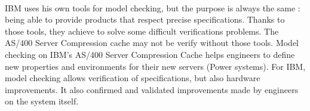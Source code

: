 \documentclass[a4paper,12pt]{article} %
\begin{document}
\paragraph{}IBM uses his own tools for model checking, but the purpose is always the same : being able to provide products that respect precise specifications. Thanks to those tools, they achieve to solve some difficult verifications problems. The AS/400 Server Compression cache may not be verify without those tools. Model checking on IBM's AS/400 Server Compression Cache helps engineers to define new properties and environments for their new servers (Power systems). For IBM, model checking allows verification of specifications, but also hardware improvements. It also confirmed and validated improvements made by engineers on the system itself.

\newpage
\nocite{SHOHAMBEN-DAVID}


\end{document}
